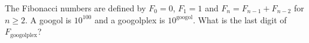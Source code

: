 The Fibonacci numbers are defined by $F_0=0$, $F_1=1$ and $F_n=F_{n-1}+F_{n-2}$ for $n\ge2$. A googol is $10^{100}$ and a googolplex is $10^{\text{googol}}$. What is the last digit of $F_{\text{googolplex}}$?
